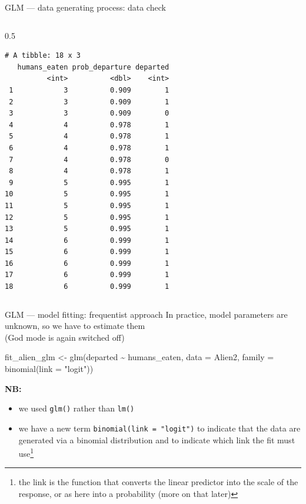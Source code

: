 \documentclass[
  10pt,
  ignorenonframetext,
  aspectratio=169,
  t]{beamer}
\newenvironment{Shaded}{\begin{snugshade}}{\end{snugshade}}
\newcommand{\AttributeTok}[1]{\textcolor[rgb]{0.40,0.45,0.13}{#1}}
\newcommand{\FunctionTok}[1]{\textcolor[rgb]{0.28,0.35,0.67}{#1}}
\newcommand{\NormalTok}[1]{\textcolor[rgb]{0.00,0.23,0.31}{#1}}
\newcommand{\OtherTok}[1]{\textcolor[rgb]{0.00,0.23,0.31}{#1}}
\newcommand{\SpecialCharTok}[1]{\textcolor[rgb]{0.37,0.37,0.37}{#1}}
\newcommand{\StringTok}[1]{\textcolor[rgb]{0.13,0.47,0.30}{#1}}
\providecommand{\tightlist}{%
  \setlength{\itemsep}{0pt}\setlength{\parskip}{0pt}}
\newcommand{\bluenorm}[1]{\textcolor{bluebeamer}{#1}}
\let\oldtexttt\texttt
\renewcommand{\texttt}[1]{\colorbox{gray!20}{\oldtexttt{#1}}}
\begin{document}
\begin{frame}[fragile]{GLM --- data generating process: data check}
\begin{columns}[T]
\begin{column}{0.5\linewidth}
\begin{verbatim}
# A tibble: 18 x 3
   humans_eaten prob_departure departed
          <int>          <dbl>    <int>
 1            3          0.909        1
 2            3          0.909        1
 3            3          0.909        0
 4            4          0.978        1
 5            4          0.978        1
 6            4          0.978        1
 7            4          0.978        0
 8            4          0.978        1
 9            5          0.995        1
10            5          0.995        1
11            5          0.995        1
12            5          0.995        1
13            5          0.995        1
14            6          0.999        1
15            6          0.999        1
16            6          0.999        1
17            6          0.999        1
18            6          0.999        1
\end{verbatim}

\normalsize
\end{column}
\end{columns}
\end{frame}

\begin{frame}[fragile]{GLM --- model fitting: frequentist approach}
\protect{}\label{glm-model-fitting-frequentist-approach}
In practice, model parameters are \bluenorm{unknown}, so we have to
estimate them\\
(God mode is again switched off)

\vspace{1em}

\footnotesize

\begin{Shaded}
\begin{Highlighting}[]
\NormalTok{fit\_alien\_glm }\OtherTok{\textless{}{-}} \FunctionTok{glm}\NormalTok{(departed }\SpecialCharTok{\textasciitilde{}}\NormalTok{ humans\_eaten, }\AttributeTok{data =}\NormalTok{ Alien2, }\AttributeTok{family =} \FunctionTok{binomial}\NormalTok{(}\AttributeTok{link =} \StringTok{"logit"}\NormalTok{))}
\end{Highlighting}
\end{Shaded}

\normalsize

\textbf{NB:}

\begin{itemize}
\tightlist
\item
  we used \texttt{glm()} rather than \texttt{lm()}
\item
  we have a new term \texttt{binomial(link\ =\ "logit")} to indicate
  that the data are generated via a binomial distribution and to
  indicate which link the fit must
  use\footnote{the link is the function that converts the linear predictor into the scale of the response, or as here into a probability (more on that later)}
\end{itemize}
\end{frame}
\end{document}
